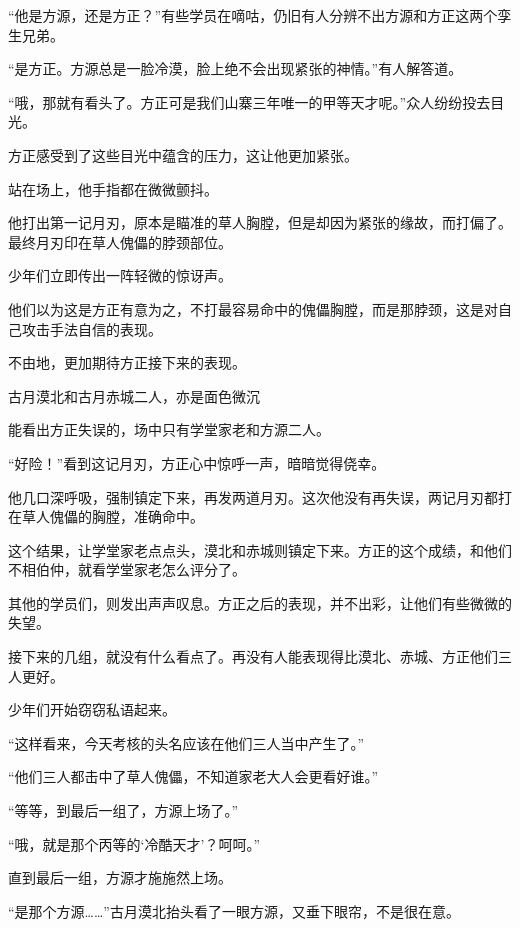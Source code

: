 
\begin{this_body}

“他是方源，还是方正？”有些学员在嘀咕，仍旧有人分辨不出方源和方正这两个孪生兄弟。

“是方正。方源总是一脸冷漠，脸上绝不会出现紧张的神情。”有人解答道。

“哦，那就有看头了。方正可是我们山寨三年唯一的甲等天才呢。”众人纷纷投去目光。

方正感受到了这些目光中蕴含的压力，这让他更加紧张。

站在场上，他手指都在微微颤抖。

他打出第一记月刃，原本是瞄准的草人胸膛，但是却因为紧张的缘故，而打偏了。最终月刃印在草人傀儡的脖颈部位。

少年们立即传出一阵轻微的惊讶声。

他们以为这是方正有意为之，不打最容易命中的傀儡胸膛，而是那脖颈，这是对自己攻击手法自信的表现。

不由地，更加期待方正接下来的表现。

古月漠北和古月赤城二人，亦是面色微沉

能看出方正失误的，场中只有学堂家老和方源二人。

“好险！”看到这记月刃，方正心中惊呼一声，暗暗觉得侥幸。

他几口深呼吸，强制镇定下来，再发两道月刃。这次他没有再失误，两记月刃都打在草人傀儡的胸膛，准确命中。

这个结果，让学堂家老点点头，漠北和赤城则镇定下来。方正的这个成绩，和他们不相伯仲，就看学堂家老怎么评分了。

其他的学员们，则发出声声叹息。方正之后的表现，并不出彩，让他们有些微微的失望。

接下来的几组，就没有什么看点了。再没有人能表现得比漠北、赤城、方正他们三人更好。

少年们开始窃窃私语起来。

“这样看来，今天考核的头名应该在他们三人当中产生了。”

“他们三人都击中了草人傀儡，不知道家老大人会更看好谁。”

“等等，到最后一组了，方源上场了。”

“哦，就是那个丙等的‘冷酷天才’？呵呵。”

直到最后一组，方源才施施然上场。

“是那个方源……”古月漠北抬头看了一眼方源，又垂下眼帘，不是很在意。


\end{this_body}
